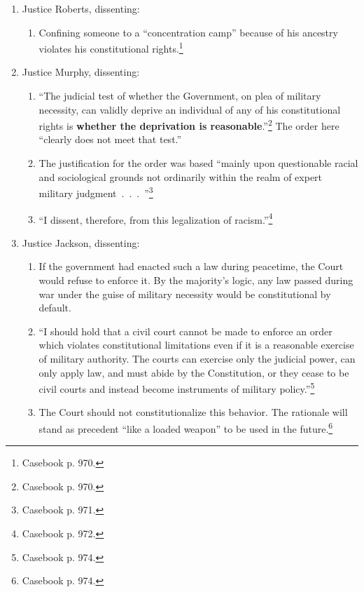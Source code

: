 \begin{enumerate}
    \begin{enumerate}
        \item ``~.~.~.~the validity of action under the war power must be 
        judged wholly in the context of war.''\footnote{Casebook p. 969.}
    \end{enumerate}
    \item Justice Roberts, dissenting:
    \begin{enumerate}
        \item Confining someone to a ``concentration camp'' because of his 
        ancestry violates his constitutional rights.\footnote{Casebook p. 
        970.}
    \end{enumerate}
    \item Justice Murphy, dissenting:
    \begin{enumerate}
        \item ``The judicial test of whether the Government, on plea of 
        military necessity, can validly deprive an individual of any of 
        his constitutional rights is \textbf{whether the deprivation is 
        reasonable}.''\footnote{Casebook p. 970.} The order here ``clearly 
        does not meet that test.''
        \item The justification for the order was based ``mainly upon 
        questionable racial and sociological grounds not ordinarily within 
        the realm of expert military judgment~.~.~.~''\footnote{Casebook 
        p. 971.}
        \item ``I dissent, therefore, from this legalization of 
        racism.''\footnote{Casebook p. 972.}
    \end{enumerate}
    \item Justice Jackson, dissenting:
    \begin{enumerate}
        \item If the government had enacted such a law during peacetime, 
        the Court would refuse to enforce it. By the majority's logic, any 
        law passed during war under the guise of military necessity would 
        be constitutional by default.
        \item ``I should hold that a civil court cannot be made to enforce 
        an order which violates constitutional limitations even if it is a 
        reasonable exercise of military authority. The courts can exercise 
        only the judicial power, can only apply law, and must abide by the 
        Constitution, or they cease to be civil courts and instead become 
        instruments of military policy.''\footnote{Casebook p. 974.}
        \item The Court should not constitutionalize this behavior. The 
        rationale will stand as precedent ``like a loaded weapon'' to be used 
        in the future.\footnote{Casebook p. 974.}
    \end{enumerate}
\end{enumerate}

